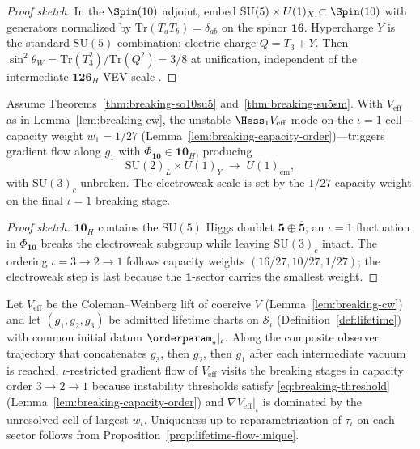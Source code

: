 \begin{proof}[Proof sketch]
In the $\Spin(10)$ adjoint, embed
$\mathrm{SU}(5)\times U(1)_X\subset\Spin(10)$ with generators normalized by
$\mathrm{Tr}(T_aT_b)=\delta_{ab}$ on the spinor $\mathbf{16}$. Hypercharge
$Y$ is the standard $\mathrm{SU}(5)$ combination; electric charge
$Q=T_3+Y$. Then
$\sin^2\theta_W=\mathrm{Tr}(T_3^2)/\mathrm{Tr}(Q^2)=3/8$ at unification,
independent of the intermediate $\mathbf{126}_H$ VEV scale
\cite{GeorgiGlashow1974,Witten1985}.
\end{proof}

\begin{theorem}\label{thm:breaking-ew}
Assume Theorems~\ref{thm:breaking-so10su5} and~\ref{thm:breaking-su5sm}.
With $V_{\mathrm{eff}}$ as in Lemma~\ref{lem:breaking-cw}, the unstable
$\Hess_1 V_{\mathrm{eff}}$ mode on the $\iota=1$ cell---capacity weight
$w_1=1/27$ (Lemma~\ref{lem:breaking-capacity-order})---triggers gradient flow
along $g_1$ with $\Phi_{\mathbf{10}}\in\mathbf{10}_H$, producing
\begin{equation}\label{eq:breaking-ew}
  \mathrm{SU}(2)_L\times U(1)_Y
  \;\longrightarrow\;
  U(1)_{\mathrm{em}},
\end{equation}
with $\mathrm{SU}(3)_c$ unbroken. The electroweak scale is set by the
$1/27$ capacity weight on the final $\iota=1$ breaking stage.
\end{theorem}

\begin{proof}[Proof sketch]
$\mathbf{10}_H$ contains the $\mathrm{SU}(5)$ Higgs doublet
$\mathbf{5}\oplus\overline{\mathbf{5}}$; an $\iota=1$ fluctuation in
$\Phi_{\mathbf{10}}$ breaks the electroweak subgroup while leaving
$\mathrm{SU}(3)_c$ intact. The ordering $\iota=3\to2\to1$ follows capacity
weights $(16/27,10/27,1/27)$; the electroweak step is last because the
$\mathbf{1}$-sector carries the smallest weight.
\end{proof}

\begin{proposition}
\label{prop:breaking-sequential}
Let $V_{\mathrm{eff}}$ be the Coleman--Weinberg lift of coercive $V$
(Lemma~\ref{lem:breaking-cw}) and let $(g_1,g_2,g_3)$ be admitted lifetime
charts on $\mathcal{S}_\iota$ (Definition~\ref{def:lifetime}) with common
initial datum $\orderparam_\star|_\iota$. Along the composite observer trajectory
that concatenates $g_3$, then $g_2$, then $g_1$ after each intermediate vacuum is
reached, $\iota$-restricted gradient flow of $V_{\mathrm{eff}}$ visits the
breaking stages in capacity order $3\to2\to1$ because instability thresholds
satisfy \eqref{eq:breaking-threshold} (Lemma~\ref{lem:breaking-capacity-order})
and $\nabla V_{\mathrm{eff}}|_\iota$ is dominated by the unresolved cell of
largest $w_\iota$. Uniqueness up to reparametrization of $\tau_\iota$ on each
sector follows from Proposition~\ref{prop:lifetime-flow-unique}.
\end{proposition}

